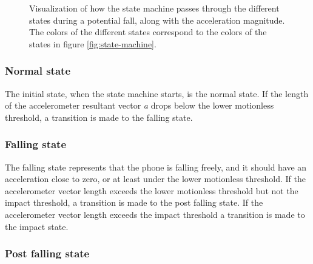 \documentclass[12pt, a4paper, onecolumn]{article}
\begin{document}
	\begin{figure}[H]
		\centering
		\caption{Visualization of how the state machine passes through the different states during a potential fall, along with the acceleration magnitude. The colors of the different states correspond to the colors of the states in figure \ref{fig:state-machine}.}%
		\label{fig:fall-data-state-machine}%
	\end{figure}
	
	\subsubsection{Normal state}
	
	The initial state, when the state machine starts, is the normal state. If the length of the accelerometer resultant vector \textit{a} drops below the lower motionless threshold, a transition is made to the falling state.
	
	\subsubsection{Falling state}
	
	The falling state represents that the phone is falling freely, and it should have an acceleration close to zero, or at least under the lower motionless threshold. If the accelerometer vector length exceeds the lower motionless threshold but not the impact threshold, a transition is made to the post falling state. If the accelerometer vector length exceeds the impact threshold a transition is made to the impact state.
	
	\subsubsection{Post falling state}
	
\end{document}
